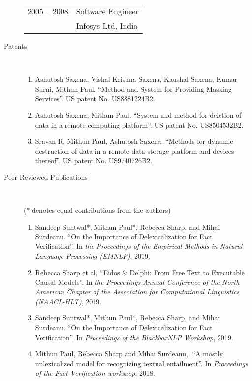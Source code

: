 \documentclass[10pt]{article}
\newcommand{\ve}[1]{{\em #1}} %
\newcommand{\ti}[1]{``#1''} %
\begin{document}
\begin{description}
\begin{tabular}{lp{4.9in}}
\hspace{-.2cm}2005 -- 2008 & Software Engineer	\\
& {\sc Infosys Ltd, India} 
\end{tabular}

\item [Patents] \
\begin{enumerate}


\item 
Ashutosh Saxena, Vishal Krishna Saxena, Kaushal Saxena, Kumar Surni, Mithun Paul. \ti{Method and System for Providing Masking Services}.  US patent No. US8881224B2.
\item 
Ashutosh Saxena, Mithun Paul. \ti{System and method for deletion of data in a remote computing platform}.  US patent No. US8504532B2.
\item 
Sravan R, Mithun Paul, Ashutosh Saxena. \ti{Methods for dynamic destruction of data in a remote data storage platform and devices thereof}.  US patent No. US9740726B2.

\end{enumerate}
\bigskip
\item [ Peer-Reviewed  Publications]\


(* denotes equal contributions from the authors)

\begin{enumerate}

\item Sandeep Suntwal*, Mithun Paul*, Rebecca Sharp, and Mihai Surdeanu.   \ti{On the Importance of Delexicalization for Fact Verification}. In \ve{ the Proceedings of the Empirical Methods in Natural Language Processing (EMNLP)}, 2019.

\item  Rebecca Sharp et al,   \ti{Eidos \& Delphi: From Free Text to Executable Causal Models}. In \ve{ the Proceedings Annual Conference of the North American Chapter of the Association for Computational Linguistics (NAACL-HLT)}, 2019.

\end{enumerate}


\begin{enumerate}
\setcounter{enumi}{2}


\item Sandeep Suntwal*, Mithun Paul*, Rebecca Sharp, and Mihai Surdeanu.   \ti{On the Importance of Delexicalization for Fact Verification}. In \ve{Proceedings of the BlackboxNLP Workshop}, 2019.

\item Mithun Paul, Rebecca Sharp and Mihai Surdeanu,.   \ti{A mostly unlexicalized model for recognizing textual entailment}. In \ve{Proceedings of the Fact Verification workshop}, 2018.


\end{enumerate}
\end{description}
\end{document}
